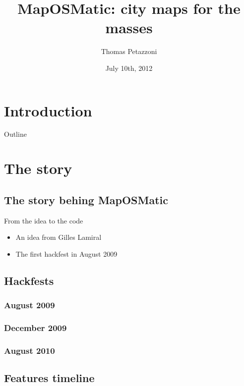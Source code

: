 \documentclass{beamer}
\title{MapOSMatic: city maps for the masses}
\author{Thomas {\sc Petazzoni}}
\institute{Libre Software Meeting}
\date{July 10th, 2012}
\begin{document}
\section{Introduction}
\begin{frame}[t]
  \titlepage
\end{frame}

\begin{frame}[t]{Outline}
  \setcounter{tocdepth}{1}
  \tableofcontents
\end{frame}

\section{The story}

\subsection{The story behing MapOSMatic}
\begin{frame}[t]{From the idea to the code}
  \begin{itemize}
    \item<1-> An idea from Gilles Lamiral
    \item<2-> The first hackfest in August 2009
  \end{itemize}
\end{frame}

\subsection{Hackfests}
\subsubsection{August 2009}
\subsubsection{December 2009}
\subsubsection{August 2010}

\subsection{Features timeline}
\end{document}
